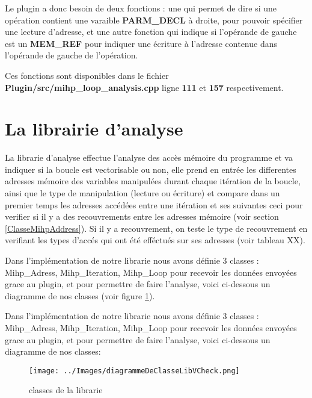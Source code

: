 \documentclass[12pt,french]{article}
\begin{document}
Le plugin a donc besoin de deux fonctions : une qui permet de dire si une opération contient une varaible \textbf{PARM\_DECL} à droite, pour pouvoir spécifier une lecture d'adresse, et une autre fonction qui indique si l'opérande de gauche est un \textbf{MEM\_REF} pour indiquer une écriture à l'adresse contenue dans l'opérande de gauche de l'opération.

Ces fonctions sont disponibles dans le fichier \textbf{Plugin/src/mihp\_loop\_analysis.cpp} ligne \textbf{111} et \textbf{157} respectivement.

\section{\color{blue}La librairie d'analyse}

La librarie d'analyse effectue l'analyse des accès mémoire du programme et va indiquer si la boucle est vectorisable ou non, elle prend en entrée les differentes adresses mémoire des variables manipulées durant chaque itération de la boucle, ainsi que le type de manipulation (lecture ou écriture) et compare dans un premier temps les adresses accédées entre une itération et ses suivantes ceci pour verifier si il y a des recouvrements entre les adresses mémoire (voir section \ref{ClasseMihpAddress}). Si il y a recouvrement, on teste le type de recouvrement en verifiant les types d'accés qui ont été efféctués sur ses adresses (voir tableau XX).

Dans l'implémentation de notre librarie nous avons définie 3 classes : Mihp\_Adress, Mihp\_Iteration, Mihp\_Loop pour recevoir les données envoyées grace au plugin, et pour permettre de faire l'analyse, voici ci-dessous un diagramme de nos classes (voir figure \ref{DiagrammeClasseLib}).


Dans l'implémentation de notre librarie nous avons définie 3 classes : Mihp\_Adress, Mihp\_Iteration, Mihp\_Loop pour recevoir les données envoyées grace au plugin, et pour permettre de faire l'analyse, voici ci-dessous un diagramme de nos classes: 
\begin{figure} %
	\begin{center}
		\texttt{[image: ../Images/diagrammeDeClasseLibVCheck.png]}
	\end{center}
	\caption{ classes de la librarie}
	\label{DiagrammeClasseLib}
\end{figure}

\end{document}
